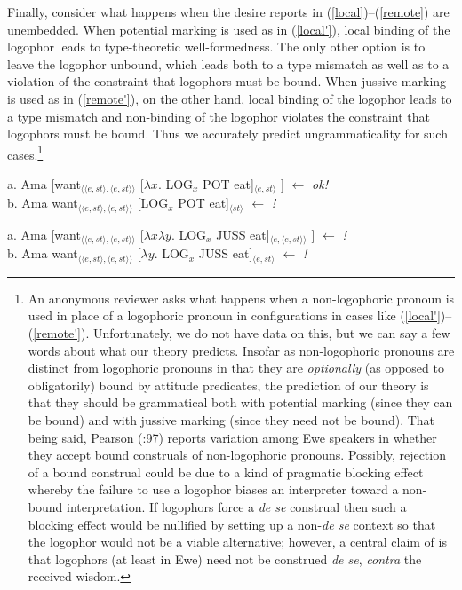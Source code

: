\documentclass[output=paper
,modfonts
,nonflat]{langsci/langscibook}
\newcommand{\á}{\'{ã}}
\newcommand{\É}{\'{\~{ε}}}
\newcommand{\È}{\`{\~{ε}}}
\newcommand{\í}{\'{\~{i}}}
\newcommand{\ì}{\`{\~{i}}}
\newcommand{\Ó}{\'{\~{ɔ}}}
\newcommand{\Ò}{\`{\~{ɔ}}}
\newcommand{\ú}{\'{ũ}}
\newcommand{\ù}{\`{ũ}}
\begin{document}
Finally, consider what happens when the desire reports in (\ref{local})--(\ref{remote}) are unembedded. When potential marking is used as in (\ref{local'}), local binding of the logophor leads to type-theoretic well-formedness. The only other option is to leave the logophor unbound, which leads both to a type mismatch as well as to a violation of the constraint that logophors must be bound. When jussive marking is used as in (\ref{remote'}), on the other hand, local binding of the logophor leads to a type mismatch and non-binding of the logophor violates the constraint that logophors must be bound. Thus we accurately predict ungrammaticality for such cases.\footnote{An anonymous reviewer asks what happens when a non-logophoric pronoun is used in place of a logophoric pronoun in configurations in cases like (\ref{local'})--(\ref{remote'}). Unfortunately, we do not have data on this, but we can say a few words about what our theory predicts. Insofar as non-logophoric pronouns are distinct from logophoric pronouns in that they are {\em optionally} (as opposed to obligatorily) bound by attitude predicates, the prediction of our theory is that they should be grammatical both with potential marking (since they can be bound) and with jussive marking (since they need not be bound). That being said, Pearson (\citeyear{pearson15}:97) reports variation among Ewe speakers in whether they accept bound construals of non-logophoric pronouns. Possibly, rejection of a bound construal could be due to a kind of pragmatic blocking effect whereby the failure to use a logophor biases an interpreter toward a non-bound interpretation. If logophors force a {\em de se} construal then such a blocking effect would be nullified by setting up a non-{\em de se} context so that the logophor would not be a viable alternative; however, a central claim of \cite{pearson15} is that logophors (at least in Ewe) need not be construed {\em de se}, {\em contra} the received wisdom.}



\ea 
a. Ama [want$_{\langle\langle e,st\rangle,\langle e,st\rangle\rangle}$ [$\lambda x$. LOG$_{x}$ POT eat]$_{\langle e,st\rangle}$ ] \hfill $\leftarrow$ {\em ok!}\\
b. Ama want$_{\langle\langle e,st\rangle,\langle e,st\rangle\rangle}$ [LOG$_{x}$ POT eat]$_{\langle st\rangle}$  \hfill $\leftarrow$ {\em *!} \label{local'}
\z

\ea 
a. Ama [want$_{\langle\langle e,st\rangle,\langle e,st\rangle\rangle}$ [$\lambda x\lambda y$. LOG$_{x}$ JUSS eat]$_{\langle e,\langle e,st\rangle\rangle}$ ] \hfill $\leftarrow$ {\em *!}\\
b. Ama want$_{\langle\langle e,st\rangle,\langle e,st\rangle\rangle}$ [$\lambda y$. LOG$_{x}$ JUSS eat]$_{\langle e,st\rangle}$  \hfill $\leftarrow$ {\em *!} \label{remote'}
\z
\end{document}
